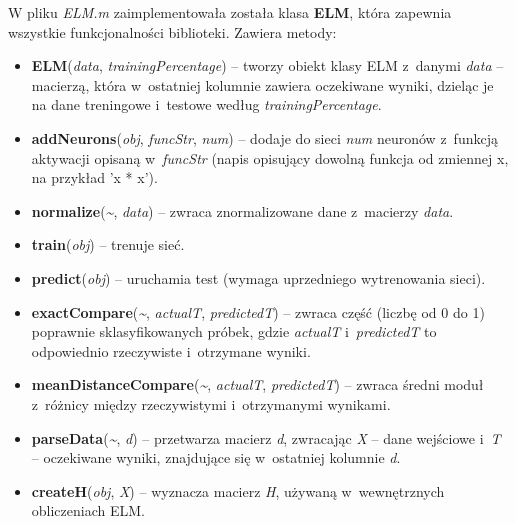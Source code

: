 \documentclass[pl]{minipw} %
\begin{document}
W pliku \textit{ELM.m} zaimplementowała została klasa \textbf{ELM}, która zapewnia wszystkie funkcjonalności biblioteki. Zawiera metody:
\begin{itemize}
\item \textbf{ELM}(\textit{data}, \textit{trainingPercentage}) -- tworzy obiekt klasy ELM z~danymi \textit{data} -- macierzą, która w~ostatniej kolumnie zawiera oczekiwane wyniki, dzieląc je na dane treningowe i~testowe według \textit{trainingPercentage}.
\item \textbf{addNeurons}(\textit{obj}, \textit{funcStr}, \textit{num}) -- dodaje do sieci \textit{num} neuronów z~funkcją aktywacji opisaną w~\textit{funcStr} (napis opisujący dowolną funkcja od zmiennej x, na przykład 'x * x').  
\item \textbf{normalize}(\textit{\~}, \textit{data}) -- zwraca znormalizowane dane z~macierzy \textit{data}.
\item \textbf{train}(\textit{obj}) -- trenuje sieć.
\item \textbf{predict}(\textit{obj}) -- uruchamia test (wymaga uprzedniego wytrenowania sieci).
\item \textbf{exactCompare}(\textit{\~}, \textit{actualT}, \textit{predictedT}) -- zwraca część (liczbę od 0 do 1) poprawnie sklasyfikowanych próbek, gdzie \textit{actualT} i~\textit{predictedT} to odpowiednio rzeczywiste i~otrzymane wyniki.
\item \textbf{meanDistanceCompare}(\textit{\~}, \textit{actualT}, \textit{predictedT}) -- zwraca średni moduł z~różnicy między rzeczywistymi i~otrzymanymi wynikami.
\item \textbf{parseData}(\textit{\~}, \textit{d}) -- przetwarza macierz \textit{d}, zwracając \textit{X} -- dane wejściowe i~\textit{T} -- oczekiwane wyniki, znajdujące się w~ostatniej kolumnie \textit{d}.
\item \textbf{createH}(\textit{obj}, \textit{X}) -- wyznacza macierz \textit{H}, używaną w~wewnętrznych obliczeniach ELM.
\end{itemize}
\end{document}
